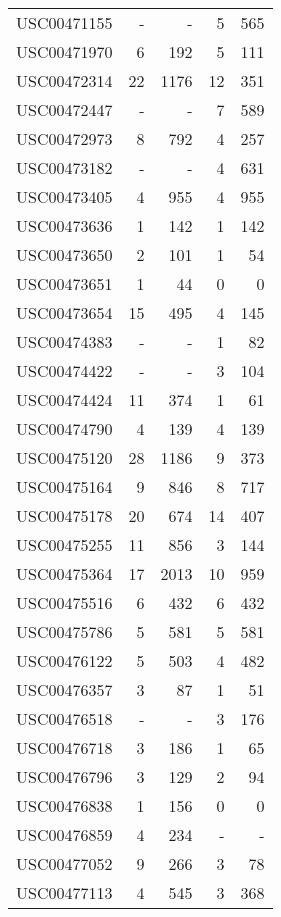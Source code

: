 \begin{table}[h!]
\begin{tabular}{l r r r r}
				USC00471155	 & 	-	 & 	-	 & 	5	 & 	565 \\
				USC00471970	 & 	6	 & 	192	 & 	5	 & 	111 \\
				USC00472314	 & 	22	 & 	1176	 & 	12	 & 	351 \\
				USC00472447	 & 	-	 & 	-	 & 	7	 & 	589 \\
				USC00472973	 & 	8	 & 	792	 & 	4	 & 	257 \\
				USC00473182	 & 	-	 & 	-	 & 	4	 & 	631 \\
				USC00473405	 & 	4	 & 	955	 & 	4	 & 	955 \\
				USC00473636	 & 	1	 & 	142	 & 	1	 & 	142 \\
				USC00473650	 & 	2	 & 	101	 & 	1	 & 	54 \\
				USC00473651	 & 	1	 & 	44	 & 	0	 & 	0 \\
				USC00473654	 & 	15	 & 	495	 & 	4	 & 	145 \\
				USC00474383	 & 	-	 & 	-	 & 	1	 & 	82 \\
				USC00474422	 & 	-	 & 	-	 & 	3	 & 	104 \\
				USC00474424	 & 	11	 & 	374	 & 	1	 & 	61 \\
				USC00474790	 & 	4	 & 	139	 & 	4	 & 	139 \\
				USC00475120	 & 	28	 & 	1186	 & 	9	 & 	373  \\
				USC00475164	 & 	9	 & 	846	 & 	8	 & 	717 \\
				USC00475178	 & 	20	 & 	674	 & 	14	 & 	407 \\
				USC00475255	 & 	11	 & 	856	 & 	3	 & 	144 \\
				USC00475364	 & 	17	 & 	2013	 & 	10	 & 	959  \\
				USC00475516	 & 	6	 & 	432	 & 	6	 & 	432 \\
				USC00475786	 & 	5	 & 	581	 & 	5	 & 	581 \\
				USC00476122	 & 	5	 & 	503	 & 	4	 & 	482 \\
				USC00476357	 & 	3	 & 	87	 & 	1	 & 	51 \\
				USC00476518	 & 	-	 & 	-	 & 	3	 & 	176 \\
				USC00476718	 & 	3	 & 	186	 & 	1	 & 	65 \\
				USC00476796	 & 	3	 & 	129	 & 	2	 & 	94 \\
				USC00476838	 & 	1	 & 	156	 & 	0	 & 	0 \\
				USC00476859	 & 	4	 & 	234	 & 	-	 & 	- \\
				USC00477052	 & 	9	 & 	266	 & 	3	 & 	78 \\
				USC00477113	 & 	4	 & 	545	 & 	3	 & 	368 \\

\end{tabular}
\end{table}

